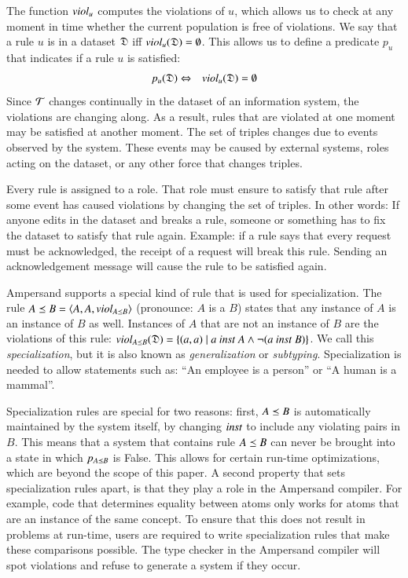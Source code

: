 \documentclass{elsarticle}
\begin{document}
   The function $\text{\it viol\/}_u$ computes the violations of $u$,
   which allows us to check at any moment in time whether the current population is free of violations.
   We say that a rule $u$ is  in a dataset $\mathfrak{D}$ iff $\text{\it viol\/}_{u}(\mathfrak{D})=\emptyset$.
   This allows us to define a predicate $p_u$ that indicates if a rule $u$ is satisfied:
\begin{eqnarray}
   p_u(\mathfrak{D})&\Leftrightarrow&\text{\it viol\/}_{u}(\mathfrak{D})=\emptyset
\end{eqnarray}
   Since $\mathcal{T}$ changes continually in the dataset of an information system, the violations are changing along.
   As a result, rules that are violated at one moment may be satisfied at another moment.
   The set of triples changes due to events observed by the system.
   These events may be caused by external systems, roles acting on the dataset, or any other force that changes triples.
   
   Every rule is assigned to a role.
   That role must ensure to satisfy that rule after some event has caused violations by changing the set of triples.
   In other words: If anyone edits in the dataset and breaks a rule, someone or something has to fix the dataset to satisfy that rule again.
   Example: if a rule says that every request must be acknowledged, the receipt of a request will break this rule.
   Sending an acknowledgement message will cause the rule to be satisfied again.

   Ampersand supports a special kind of rule that is used for specialization.
   The rule $A\preceq B = \langle A, A, viol_{A\preceq B} \rangle$ (pronounce: $A$ is a $B$) states that any instance of $A$ is an instance of $B$ as well.
   Instances of $A$ that are not an instance of $B$ are the violations of this rule: $viol_{A\isa B}(\dataset) = \{(a,a) \mid a\ \inst\ A \wedge \lnot (a\ \inst\ B)\}$.
   We call this {\em specialization}, but it is also known as {\em generalization} or {\em subtyping}.
   Specialization is needed to allow statements such as: ``An employee is a person'' or ``A human is a mammal''.
   
   Specialization rules are special for two reasons:
   first, $A\preceq B$ is automatically maintained by the system itself, by changing $\text{\it inst\/}$ to include any violating pairs in $B$.
   This means that a system that contains rule $A\preceq B$ can never be brought into a state in which $p_{A\preceq B}$ is False.
   This allows for certain run-time optimizations, which are beyond the scope of this paper.
   A second property that sets specialization rules apart, is that they play a role in the Ampersand compiler.
   For example, code that determines equality between atoms only works for atoms that are an instance of the same concept.
   To ensure that this does not result in problems at run-time, users are required to write specialization rules that make these comparisons possible.
   The type checker in the Ampersand compiler will spot violations and refuse to generate a system if they occur.
\end{document}

